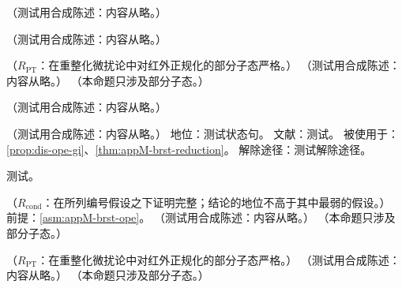 \begin{lemma}\label{lem:appM-lbc-formal}
（测试用合成陈述：内容从略。）
\end{lemma}

\begin{remark}\label{rem:appM-joglekar-lee}
（测试用合成陈述：内容从略。）
\end{remark}

\begin{lemma}\label{lem:appM-alien-vanish}
（$R_{\mathrm{PT}}$：在重整化微扰论中对红外正规化的部分子态严格。）
（测试用合成陈述：内容从略。）
（本命题只涉及部分子态。）
\end{lemma}

\begin{remark}[前向在壳胶子矩阵元的红外微妙之处]\label{rem:appM-forward-aliens}
（测试用合成陈述：内容从略。）
\end{remark}

\begin{assumption}\label{asm:appM-brst-ope}
（测试用合成陈述：内容从略。）
地位：测试状态句。
文献：测试。
被使用于：\cref{prop:dis-ope-gi}、\cref{thm:appM-brst-reduction}。
解除途径：测试解除途径。
\end{assumption}
\begin{proofsketch}测试。\end{proofsketch}

\begin{theorem}\label{thm:appM-brst-reduction}
（$R_{\mathrm{cond}}$：在所列编号假设之下证明完整；结论的地位不高于其中最弱的假设。）
前提：\cref{asm:appM-brst-ope}。
（测试用合成陈述：内容从略。）
（本命题只涉及部分子态。）
\end{theorem}

\begin{lemma}\label{lem:appM-forward-forests}
（$R_{\mathrm{PT}}$：在重整化微扰论中对红外正规化的部分子态严格。）
（测试用合成陈述：内容从略。）
（本命题只涉及部分子态。）
\end{lemma}

